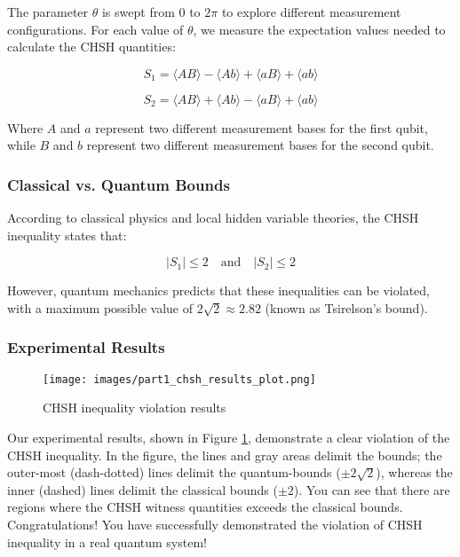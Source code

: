 \documentclass[12pt,a4paper]{article}
\begin{document}
The parameter $\theta$ is swept from 0 to $2\pi$ to explore different measurement configurations. For each value of $\theta$, we measure the expectation values needed to calculate the CHSH quantities:

\begin{equation}
S_1 = \langle AB \rangle - \langle Ab \rangle + \langle aB \rangle + \langle ab \rangle
\end{equation}

\begin{equation}
S_2 = \langle AB \rangle + \langle Ab \rangle - \langle aB \rangle + \langle ab \rangle
\end{equation}

Where $A$ and $a$ represent two different measurement bases for the first qubit, while $B$ and $b$ represent two different measurement bases for the second qubit.

\subsubsection{Classical vs. Quantum Bounds}

According to classical physics and local hidden variable theories, the CHSH inequality states that:

\begin{equation}
|S_1| \leq 2 \quad \text{and} \quad |S_2| \leq 2
\end{equation}

However, quantum mechanics predicts that these inequalities can be violated, with a maximum possible value of $2\sqrt{2} \approx 2.82$ (known as Tsirelson's bound).

\subsubsection{Experimental Results}

\begin{figure}[h]
\centering
\texttt{[image: images/part1\_chsh\_results\_plot.png]}
\caption{CHSH inequality violation results}
\label{fig:chsh_results}
\end{figure}

Our experimental results, shown in Figure \ref{fig:chsh_results}, demonstrate a clear violation of the CHSH inequality. In the figure, the lines and gray areas delimit the bounds; the outer-most (dash-dotted) lines delimit the quantum-bounds ($\pm 2\sqrt{2}$), whereas the inner (dashed) lines delimit the classical bounds ($\pm 2$). You can see that there are regions where the CHSH witness quantities exceeds the classical bounds. Congratulations! You have successfully demonstrated the violation of CHSH inequality in a real quantum system!
\end{document}
